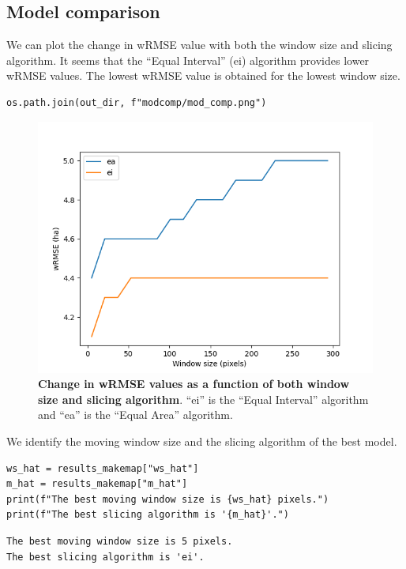\documentclass[paper=a4, 12pt, DIV=12]{scrartcl}
\begin{document}
\subsection{Model comparison}
\label{sec:org529946e}

We can plot the change in wRMSE value with both the window size and slicing algorithm. It seems that the ``Equal Interval'' (ei) algorithm provides lower wRMSE values. The lowest wRMSE value is obtained for the lowest window size. 

\begin{verbatim}
os.path.join(out_dir, f"modcomp/mod_comp.png")
\end{verbatim}

\begin{figure}[H]
\centering
\includegraphics[width=0.8\linewidth]{outputs/modcomp/mod_comp.png}
\caption{\label{fig:org55e06d5}\textbf{Change in wRMSE values as a function of both window size and slicing algorithm}. ``ei'' is the ``Equal Interval'' algorithm and ``ea'' is the ``Equal Area'' algorithm.}
\end{figure}

We identify the moving window size and the slicing algorithm of the best model.

\begin{verbatim}
ws_hat = results_makemap["ws_hat"]
m_hat = results_makemap["m_hat"]
print(f"The best moving window size is {ws_hat} pixels.")
print(f"The best slicing algorithm is '{m_hat}'.")
\end{verbatim}

\begin{verbatim}
The best moving window size is 5 pixels.
The best slicing algorithm is 'ei'.
\end{verbatim}
\end{document}
